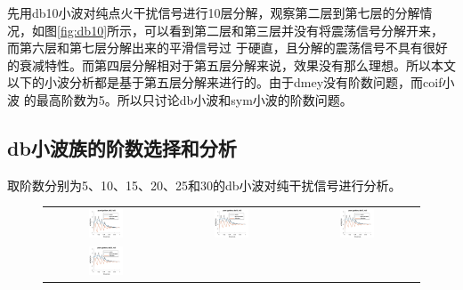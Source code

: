 \par 先用db10小波对纯点火干扰信号进行10层分解，观察第二层到第七层的分解情况，如图\ref{fig:db10}所示，可以看到第二层和第三层并没有将震荡信号分解开来，而第六层和第七层分解出来的平滑信号过
于硬直，且分解的震荡信号不具有很好的衰减特性。而第四层分解相对于第五层分解来说，效果没有那么理想。所以本文以下的小波分析都是基于第五层分解来进行的。由于dmey没有阶数问题，而coif小波
的最高阶数为5。所以只讨论db小波和sym小波的阶数问题。
\subsection{db小波族的阶数选择和分析}
取阶数分别为5、10、15、20、25和30的db小波对纯干扰信号进行分析。
\begin{figure}[!htb]
	\centering
	\begin{tabular}{ccc}
		\includegraphics[width=0.3\textwidth]{thesis_figure/ion_chapter/db5_lvl5}&
		\includegraphics[width=0.3\textwidth]{thesis_figure/ion_chapter/db10_lvl5_1}&
		\includegraphics[width=0.3\textwidth]{thesis_figure/ion_chapter/db15_lvl5}\\
		\includegraphics[width=0.3\textwidth]{thesis_figure/ion_chapter/db20_lvl5}&

\end{tabular}
\end{figure}
